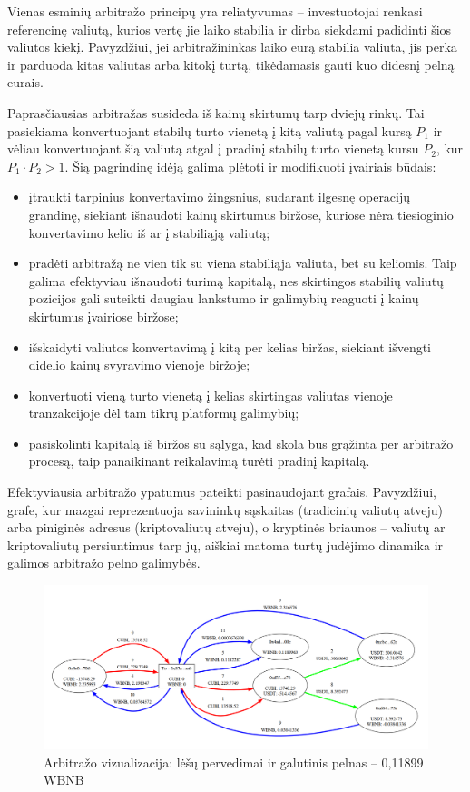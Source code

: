 \documentclass[]{VUMIFTemplateClass}
\begin{document}
Vienas esminių arbitražo principų yra reliatyvumas -- investuotojai renkasi referencinę valiutą, kurios vertę jie laiko stabilia ir dirba siekdami padidinti šios valiutos kiekį. Pavyzdžiui, jei arbitražininkas laiko eurą stabilia valiuta, jis perka ir parduoda kitas valiutas arba kitokį turtą, tikėdamasis gauti kuo didesnį pelną eurais.

Paprasčiausias arbitražas susideda iš kainų skirtumų tarp dviejų rinkų. Tai pasiekiama konvertuojant stabilų turto vienetą į kitą valiutą pagal kursą $P_1$ ir vėliau konvertuojant šią valiutą atgal į pradinį stabilų turto vienetą kursu $P_2$, kur $P_1 \cdot P_2 > 1$. Šią pagrindinę idėją galima plėtoti ir modifikuoti įvairiais būdais:

\begin{itemize}
    \item įtraukti tarpinius konvertavimo žingsnius, sudarant ilgesnę operacijų grandinę, siekiant išnaudoti kainų skirtumus biržose, kuriose nėra tiesioginio konvertavimo kelio iš ar į stabiliąją valiutą;
    \item pradėti arbitražą ne vien tik su viena stabiliąja valiuta, bet su keliomis. Taip galima efektyviau išnaudoti turimą kapitalą, nes skirtingos stabilių valiutų pozicijos gali suteikti daugiau lankstumo ir galimybių reaguoti į kainų skirtumus įvairiose biržose;
    \item išskaidyti valiutos konvertavimą į kitą per kelias biržas, siekiant išvengti didelio kainų svyravimo vienoje biržoje;
    \item konvertuoti vieną turto vienetą į kelias skirtingas valiutas vienoje tranzakcijoje dėl tam tikrų platformų galimybių;
    \item pasiskolinti kapitalą iš biržos su sąlyga, kad skola bus grąžinta per arbitražo procesą, taip panaikinant reikalavimą turėti pradinį kapitalą.
\end{itemize}

Efektyviausia arbitražo ypatumus pateikti pasinaudojant grafais. Pavyzdžiui, grafe, kur mazgai reprezentuoja savininkų sąskaitas (tradicinių valiutų atveju) arba piniginės adresus (kriptovaliutų atveju), o kryptinės briaunos – valiutų ar kriptovaliutų persiuntimus tarp jų, aiškiai matoma turtų judėjimo dinamika ir galimos arbitražo pelno galimybės. 

\begin{figure}[H]
    \centering
    \includegraphics[scale=0.3]{img/arb1.png}
    \caption{Arbitražo vizualizacija: lėšų pervedimai ir galutinis pelnas – 0,11899 WBNB}
    \label{img:chess-minimax-2}
\end{figure} 
\end{document}
